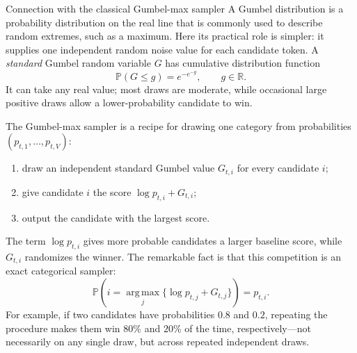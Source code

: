 \documentclass[11pt]{article}
\DeclareRobustCommand{\iperpaper}[2]{%
  \begingroup
  \hypersetup{pdfborder=0 0 0}%
  \href{iperpaper:#1}{{\color{iperpaperlink}#2}}%
  \endgroup
}
\def\iperpaper#1#2{#2}%
\newcommand{\Pp}{\mathbb{P}}
\newcommand{\argmax}{\operatorname*{arg\,max}}
\begin{document}
\begin{leveltwo}{Connection with the classical Gumbel-max sampler}
A \iperpaper{gumbel_distribution}{Gumbel distribution} is a probability distribution on the real line that is commonly used to describe random extremes, such as a maximum. Here its practical role is simpler: it supplies one independent random noise value for each candidate token. A \emph{standard} Gumbel random variable $G$ has \iperpaper{cdf_concept}{cumulative distribution function}
\[
  \Pp(G\le g)=e^{-e^{-g}}, \qquad g\in\mathbb R.
\]
It can take any real value; most draws are moderate, while occasional large positive draws allow a lower-probability candidate to win.

\begin{samepage}
The \iperpaper{gumbel_max_sampler}{Gumbel-max sampler} is a recipe for drawing one category from probabilities $(p_{t,1},\ldots,p_{t,V})$:
\begin{enumerate}
\item draw an independent standard Gumbel value $G_{t,i}$ for every candidate $i$;
\item give candidate $i$ the score $\log p_{t,i}+G_{t,i}$;
\item output the candidate with the largest score.
\end{enumerate}
\end{samepage}
The term $\log p_{t,i}$ gives more probable candidates a larger baseline score, while $G_{t,i}$ randomizes the winner. The remarkable fact is that this competition is an exact \iperpaper{categorical_name}{categorical} sampler:
\[
  \Pp\!\left(i=\iperpaper{argmax_symbol}{\argmax}_j\{\log p_{t,j}+G_{t,j}\}\right)=p_{t,i}.
\]
For example, if two candidates have probabilities $0.8$ and $0.2$, repeating the procedure makes them win $80\%$ and $20\%$ of the time, respectively---not necessarily on any single draw, but across repeated independent draws.


\end{leveltwo}
\end{document}
